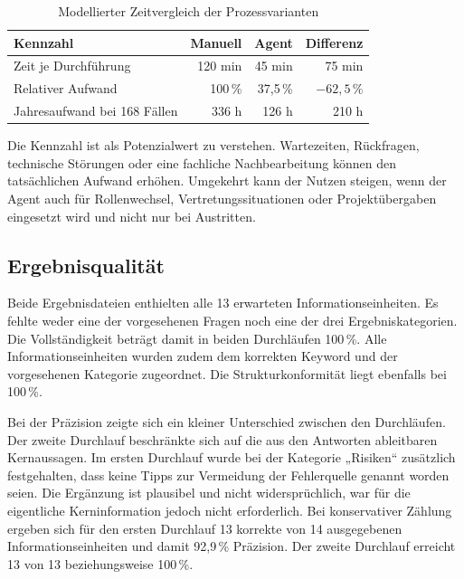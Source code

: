 \documentclass[
  10pt,
  ngerman,
  a4paper,
  toc=graduated,
  numbers=noenddot,
  headings=standardclasses,
  nonumberlist
]{scrartcl}
\newcommand{\pct}[1]{#1\,\%}
\begin{document}
\begin{table}[H]
\centering
\begin{tabularx}{\textwidth}{Y r r r}
\toprule
{}
\textbf{Kennzahl} & \textbf{Manuell} & \textbf{Agent} & \textbf{Differenz}\\
\midrule
Zeit je Durchführung & 120 min & 45 min & 75 min\\
Relativer Aufwand & \pct{100} & \pct{37{,}5} & $-\pct{62{,}5}$\\
Jahresaufwand bei 168 Fällen & 336 h & 126 h & 210 h\\
\bottomrule
\end{tabularx}
\caption{Modellierter Zeitvergleich der Prozessvarianten}
\label{tab:zeitvergleich}
\end{table}

Die Kennzahl ist als Potenzialwert zu verstehen. Wartezeiten, Rückfragen, technische Störungen oder eine fachliche Nachbearbeitung können den tatsächlichen Aufwand erhöhen. Umgekehrt kann der Nutzen steigen, wenn der Agent auch für Rollenwechsel, Vertretungssituationen oder Projektübergaben eingesetzt wird und nicht nur bei Austritten.

\subsection{Ergebnisqualität}

Beide Ergebnisdateien enthielten alle 13 erwarteten Informationseinheiten. Es fehlte weder eine der vorgesehenen Fragen noch eine der drei Ergebniskategorien. Die Vollständigkeit beträgt damit in beiden Durchläufen \pct{100}. Alle Informationseinheiten wurden zudem dem korrekten Keyword und der vorgesehenen Kategorie zugeordnet. Die Strukturkonformität liegt ebenfalls bei \pct{100}.

Bei der Präzision zeigte sich ein kleiner Unterschied zwischen den Durchläufen. Der zweite Durchlauf beschränkte sich auf die aus den Antworten ableitbaren Kernaussagen. Im ersten Durchlauf wurde bei der Kategorie „Risiken“ zusätzlich festgehalten, dass keine Tipps zur Vermeidung der Fehlerquelle genannt worden seien. Die Ergänzung ist plausibel und nicht widersprüchlich, war für die eigentliche Kerninformation jedoch nicht erforderlich. Bei konservativer Zählung ergeben sich für den ersten Durchlauf 13 korrekte von 14 ausgegebenen Informationseinheiten und damit \pct{92{,}9} Präzision. Der zweite Durchlauf erreicht 13 von 13 beziehungsweise \pct{100}.
\end{document}
